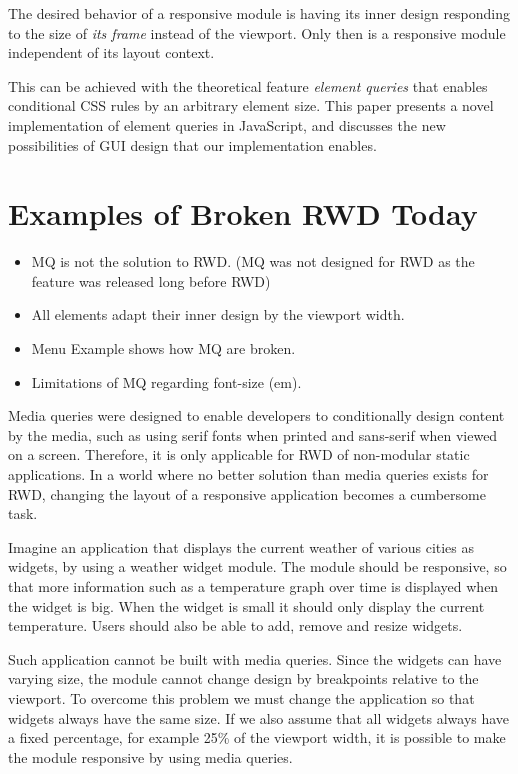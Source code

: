 \documentclass{acm_proc_article-sp}
\begin{document}
  The desired behavior of a responsive module is having its inner design responding to the size of \emph{its frame} instead of the viewport.
  Only then is a responsive module independent of its layout context.

  This can be achieved with the theoretical feature \emph{element queries} that enables conditional CSS rules by an arbitrary element size.
  This paper presents a novel implementation of element queries in JavaScript, and discusses the new possibilities of GUI design that our implementation enables.

\section{Examples of Broken RWD Today}
  \begin{itemize}
    \item MQ is not the solution to RWD. (MQ was not designed for RWD as the feature was released long before RWD)
    \item All elements adapt their inner design by the viewport width.
    \item Menu Example shows how MQ are broken.
    \item Limitations of MQ regarding font-size (em).
  \end{itemize}

  Media queries were designed to enable developers to conditionally design content by the media, such as using serif fonts when printed and sans-serif when viewed on a screen.
  Therefore, it is only applicable for RWD of non-modular static applications.
  In a world where no better solution than media queries exists for RWD, changing the layout of a responsive application becomes a cumbersome task.
  
  Imagine an application that displays the current weather of various cities as widgets, by using a weather widget module.
  The module should be responsive, so that more information such as a temperature graph over time is displayed when the widget is big.
  When the widget is small it should only display the current temperature.
  Users should also be able to add, remove and resize widgets.

  Such application cannot be built with media queries.
  Since the widgets can have varying size, the module cannot change design by breakpoints relative to the viewport.
  To overcome this problem we must change the application so that widgets always have the same size.
  If we also assume that all widgets always have a fixed percentage, for example 25\% of the viewport width, it is possible to make the module responsive by using media queries.
\end{document}
